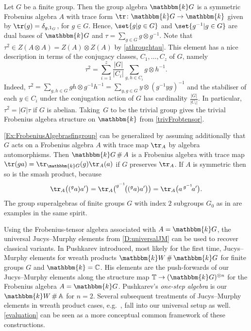 \documentclass[a4paper,11pt]{amsart}
\numberwithin{equation}{subsection}
\theoremstyle{definition}
\theoremstyle{theorem}
\theoremstyle{remark}
\newcommand\Sym{W}
\newcommand\kk{\mathbbm{k}}
\newcommand\Tos{\mathbb{T}}
\newcommand{\Ao}{\mathbb{A}}
\DeclareMathOperator\Smash{\#}
\begin{document}
 \begin{Example}\label{Ex:FrobeniusAlgebrasfingroup}
   Let $G$ be a finite group. Then the group algebra $\kk G$ is a
   symmetric Frobenius algebra $A$ with trace form $\tr\colon\kk G\to\kk$
   given by $\tr(g)=\delta_{g,1_G}$, for $g\in G$. Hence,
   $\set{g|g\in G}$ and $\set{g^{-1}|g\in G}$ are dual bases of $\kk G$
   and $\tau=\sum_{g\in G}g\otimes g^{-1}$.
   Note that $\tau^2\in Z(A\otimes A)=Z(A)\otimes Z(A)$ by \autoref{athroughtau}. This element has a nice description in terms of the conjugacy classes, $C_1,\dots,C_z$ of $G$, namely
   \[
       \tau^2 =
            \sum_{i=1}^z\frac{|G|}{|C_i|}\sum_{g,h\in C_i}g\otimes h^{-1}.
   \]
   Indeed, $\tau^2=\sum_{g,h\in G}gh\otimes g^{-1}h^{-1}=\sum_{y,g\in G}y\otimes (g^{-1}yg)^{-1}$ and the stabiliser  of each $y\in C_i$ under the conjugation action of $G$ has cardinality $\frac{|G|}{|C_i|}$. In particular, $\tau^2 =|G|\tau$ if $G$
   is abelian. Taking~$G$ to be the trivial group gives the trivial Frobenius algebra structure on $\kk$ from \autoref{trivFrobtensor}.
    \end{Example}
          \begin{Example}\label{Ex:FrobeniusAlgebrassmash}
  \autoref{Ex:FrobeniusAlgebrasfingroup} can be generalized by assuming additionally that $G$ acts on a Frobenius algebra $A$ with trace map $\tr_A$ by algebra automorphisms. Then $\kk G\Smash A$ is a Frobenius algebra with trace map $\tr(ga)=\tr_{\kk G}(g)\tr_A(a)$ if $G$ preserves $\tr_A$. If $A$ is symmetric then so is  the smash product, because
 \[
  \tr_A\bigl((^{g}a)a'\bigr)=\tr_A\bigl(^{g^{-1}}\!\bigl((^{g}a)a'\bigr)\bigr)=\tr_A\bigl(a\,^{g^{-1}}\!a'\bigr).
\]
The group superalgebras of finite groups $G$ with index $2$ subgroups $G_0$ as in \cite{Jozefiak} are examples in the same spirit.
 \end{Example}
 \begin{Remark}\label{Pushkarev}
 Using the Frobenius-tensor algebra associated with  $A=\kk G$, the universal Jucys--Murphy elements from  \autoref{D:universalJM} can be used to recover classical variants.
 In \cite{Pushkarev} Pushkarev introduced, most likely for the first time,  Jucys--Murphy elements for wreath products $\kk\Sym\Smash\kk G$ for finite groups $G$ and $\kk=\mathbb{C}$. His elements  are the push-forwards of our Jucys--Murphy elements  along the structure map $\Tos\rightarrow(\kk G)^{\otimes n}$ for the Frobenius algebra $A=\kk G$. Pushkarev's \emph{one-step algebra} is our $\kk\Sym\Smash\Ao$ for $n=2$. Several subsequent treatments of Jucys--Murphy elements in wreath product cases, e.g.\ \cite{wreathHecke, WanWang, KleshchevMuth}, fall into our universal setup as well. \autoref{evaluation} can be seen as a more conceptual common framework of these constructions.
\end{Remark}
\end{document}
